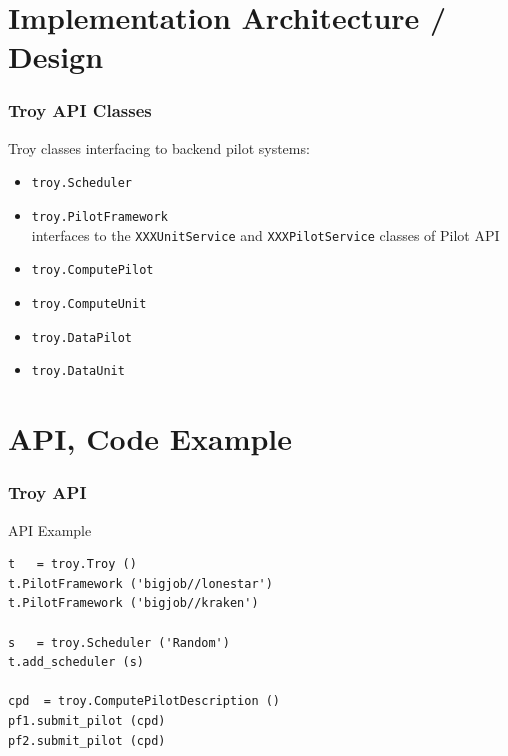 \documentclass{beamer}
\begin{document}
\section{Implementation Architecture / Design}

\begin{frame}[fragile]
	\frametitle{Troy API Classes}
   Troy classes interfacing to backend pilot systems:

  \begin{itemize}
    \item \verb|troy.Scheduler|\\
    \item \verb|troy.PilotFramework|\\
     interfaces to the \verb|XXXUnitService| and \verb|XXXPilotService|
     classes of Pilot API

    \item \verb|troy.ComputePilot|
    \item \verb|troy.ComputeUnit|

    \item \verb|troy.DataPilot|
    \item \verb|troy.DataUnit|
  \end{itemize}
\end{frame}

% 
% 

\section{API, Code Example}

\begin{frame}[fragile] 
 \frametitle{Troy API}
 {\footnotesize
  \begin{block}{API Example}
   \begin{verbatim}
t   = troy.Troy ()
t.PilotFramework ('bigjob//lonestar')
t.PilotFramework ('bigjob//kraken')

s   = troy.Scheduler ('Random')
t.add_scheduler (s)

cpd  = troy.ComputePilotDescription ()
pf1.submit_pilot (cpd)
pf2.submit_pilot (cpd)
   \end{verbatim}
  \end{block}
 }
\end{frame}
\end{document}
